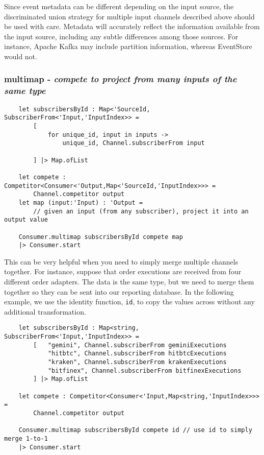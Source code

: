 \documentclass{article}
\begin{document}
Since event metadata can be different depending on the input source, the discriminated union strategy for multiple input channels described above should be used with care.  Metadata will accurately reflect the information available from the input source, including any subtle differences among those sources.  For instance, Apache Kafka may include partition information, whereas EventStore would not.

\subsubsection{multimap - \textit{compete to project from many inputs of the same type}}

\begin{verbatim}
    let subscribersById : Map<'SourceId, SubscriberFrom<'Input,'InputIndex>> =
        [
            for unique_id, input in inputs ->
                unique_id, Channel.subscriberFrom input

        ] |> Map.ofList

    let compete : Competitor<Consumer<'Output,Map<'SourceId,'InputIndex>>> =
        Channel.competitor output
    let map (input:'Input) : 'Output =
        // given an input (from any subscriber), project it into an output value

    Consumer.multimap subscribersById compete map
    |> Consumer.start
\end{verbatim}

This can be very helpful when you need to simply merge multiple channels together.  For instance, suppose that order executions are received from four different order adapters.  The data is the same type, but we need to merge them together so they can be sent into our reporting database.  In the following example, we use the identity function, \texttt{id}, to copy the values across without any additional transformation.

\begin{verbatim}
    let subscribersById : Map<string, SubscriberFrom<'Input,'InputIndex>> =
        [   "gemini", Channel.subscriberFrom geminiExecutions
            "hitbtc", Channel.subscriberFrom hitbtcExecutions
            "kraken", Channel.subscriberFrom krakenExecutions
            "bitfinex", Channel.subscriberFrom bitfinexExecutions
        ] |> Map.ofList

    let compete : Competitor<Consumer<'Input,Map<string,'InputIndex>>> =
        Channel.competitor output

    Consumer.multimap subscribersById compete id // use id to simply merge 1-to-1
    |> Consumer.start
\end{verbatim}
\end{document}
